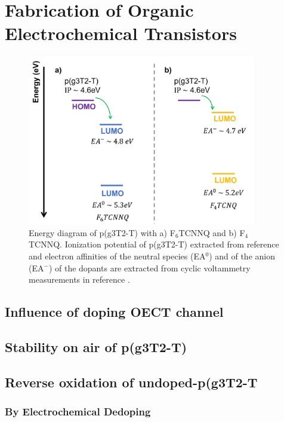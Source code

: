 \section{Fabrication of Organic Electrochemical Transistors}


\begin{figure}
  \centering
  \includegraphics[width=10cm]{Images/pdf/dopingprocess.pdf}
  \caption[Energy diagram of p(g3T2-T) and dopants F$_{6}$TCNNQ and F$_{4}$TCNNQ]{Energy diagram of p(g3T2-T) with a) F$_{6}$TCNNQ and b) F$_{4}$TCNNQ. Ionization potential of p(g3T2-T) extracted from reference \cite{tanTuningOrganicElectrochemical2022} and electron affinities of the neutral species (EA$^{0}$) and of the anion (EA$^{-}$) of the dopants are extracted from cyclic voltammetry measurements in reference \cite{kieferDoubleDopingConjugated2019}.}
  \label{fig:doping}
\end{figure}





\subsection{Influence of doping OECT channel}

\subsection{Stability on air of p(g3T2-T)}

\subsection{Reverse oxidation of undoped-p(g3T2-T}

\subsubsection{By Electrochemical Dedoping}

